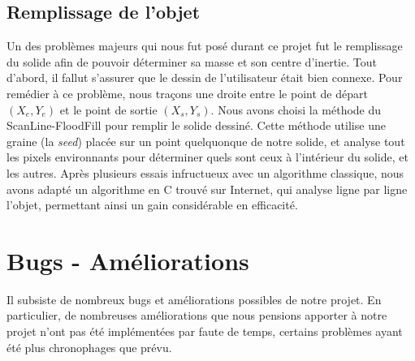 \subsection{Remplissage de l'objet}
Un des problèmes majeurs qui nous fut posé durant ce projet fut le remplissage
du solide afin de pouvoir déterminer sa masse et son centre d'inertie.
Tout d'abord, il fallut s'assurer que le dessin de l'utilisateur était bien connexe.
Pour remédier à ce problème, nous traçons une droite entre le point de départ
$(X_e,Y_e)$ et le point de sortie $(X_s,Y_s)$.
Nous avons choisi la méthode du ScanLine-FloodFill pour remplir le solide dessiné.
Cette méthode utilise une graine (la \emph{seed}) placée sur un point quelquonque
de notre solide, et analyse tout les pixels environnants pour déterminer
quels sont ceux à l'intérieur du solide, et les autres.
Après plusieurs essais infructueux avec un algorithme classique, nous avons
adapté un algorithme en C trouvé sur Internet, qui analyse ligne par ligne l'objet,
permettant ainsi un gain considérable en efficacité. 
%

\newpage

\section{Bugs - Améliorations}
Il subsiste de nombreux bugs et améliorations possibles de notre projet.
En particulier, de nombreuses améliorations que nous pensions apporter
à notre projet n'ont pas été implémentées par faute de temps, certains 
problèmes ayant été plus chronophages que prévu.
